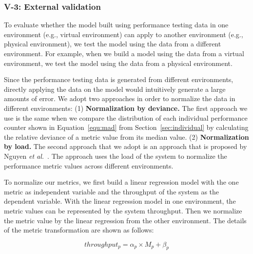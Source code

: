 \subsubsection{V-3: External validation}
To evaluate whether the model built using performance testing data in one environment (e.g., virtual environment) can apply to another environment (e.g., physical environment), we test the model using the data from a different environment. For example, when we build a model using the data from a virtual environment, we test the model using the data from a physical environment. 

Since the performance testing data is generated from different environments, directly applying the data on the model would intuitively generate a large amounts of error. We adopt two approaches in order to normalize the data in different environments: (1) \textbf{Normalization by deviance.} The first approach we use is the same when we compare the distribution of each individual performance counter shown in Equation~\ref{equ:mad} from Section~\ref{sec:individual} by calculating the relative deviance of a metric value from its median value. (2) \textbf{Normalization by load.} The second approach that we adopt is an approach that is proposed by Nguyen \textit{et al.}~\cite{Nguyen:2012:ADP:2188286.2188344}. The approach uses the load of the system to normalize the performance metric values across different environments. 



To normalize our metrics, we first build a linear regression model with the one metric as independent variable and the throughput of the system as the dependent variable. With the linear regression model in one environment, the metric values can be represented by the system throughput. Then we normalize the metric value by the linear regression from the other environment. The details of the metric transformation are shown as follows:

\begin{equation*}
throughput_{p}= \alpha_{p} \times M_{p} + \beta_{p}
\end{equation*}

